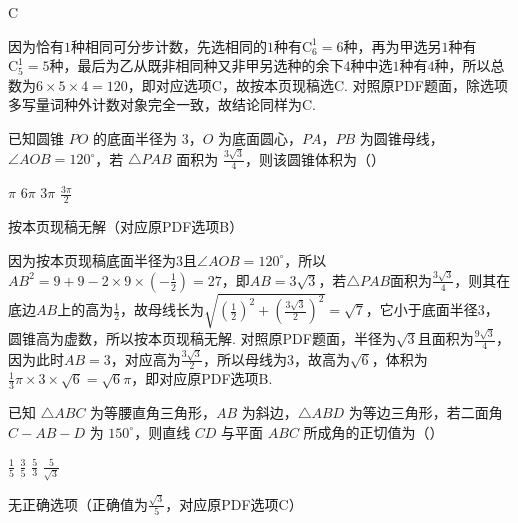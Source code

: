 \begin{answer}
C
\end{answer}

\begin{solution}
因为恰有\(1\)种相同可分步计数，先选相同的\(1\)种有\(\mathrm C_{6}^{1}=6\)种，再为甲选另\(1\)种有\(\mathrm C_{5}^{1}=5\)种，最后为乙从既非相同种又非甲另选种的余下\(4\)种中选\(1\)种有\(4\)种，所以总数为\(6\times 5\times 4=120\)，即对应选项C，故按本页现稿选C. 对照原PDF题面，除选项多写量词种外计数对象完全一致，故结论同样为C.
\end{solution}

\begin{problem}
已知圆锥 \(PO\) 的底面半径为 3，\(O\) 为底面圆心，\(PA\)，\(PB\) 为圆锥母线，\(\angle AOB=120^\circ\)，若 \(\triangle PAB\) 面积为 \( \frac{3\sqrt3}{4}\)，则该圆锥体积为（\quad）

\choices
    {\(\pi\)}
    {\(6\pi\)}
    {\(3\pi\)}
    {\(\frac{3\pi}{2}\)}
\end{problem}

\begin{answer}
按本页现稿无解（对应原PDF选项B）
\end{answer}

\begin{solution}
因为按本页现稿底面半径为\(3\)且\(\angle AOB=120^{\circ}\)，所以\(AB^{2}=9+9-2\times 9\times \left(-\frac{1}{2}\right)=27\)，即\(AB=3\sqrt{3}\)，若\(\triangle PAB\)面积为\(\frac{3\sqrt{3}}{4}\)，则其在底边\(AB\)上的高为\(\frac{1}{2}\)，故母线长为\(\sqrt{\left(\frac{1}{2}\right)^{2}+\left(\frac{3\sqrt{3}}{2}\right)^{2}}=\sqrt{7}\)，它小于底面半径\(3\)，圆锥高为虚数，所以按本页现稿无解. 对照原PDF题面，半径为\(\sqrt{3}\)且面积为\(\frac{9\sqrt{3}}{4}\)，因为此时\(AB=3\)，对应高为\(\frac{3\sqrt{3}}{2}\)，所以母线为\(3\)，故高为\(\sqrt{6}\)，体积为\(\frac{1}{3}\pi\times 3\times \sqrt{6}=\sqrt{6}\pi\)，即对应原PDF选项B.
\end{solution}

\begin{problem}
已知 \(\triangle ABC\) 为等腰直角三角形，\(AB\) 为斜边，\(\triangle ABD\) 为等边三角形，若二面角 \(C-AB-D\) 为 \(150^\circ\)，则直线 \(CD\) 与平面 \(ABC\) 所成角的正切值为（\quad）

\choices
    {\(\frac15\)}
    {\(\frac{3}{5}\)}
    {\(\frac{5}{3}\)}
    {\(\frac{5}{\sqrt3}\)}
\end{problem}

\begin{answer}
无正确选项（正确值为\(\frac{\sqrt{3}}{5}\)，对应原PDF选项C）
\end{answer}

